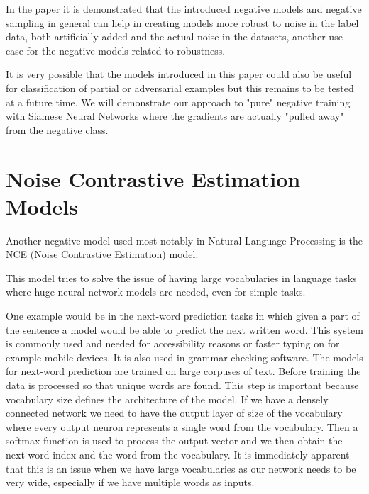 \documentclass[b5paper]{book}
\let\cite\parencite
\begin{document}
In the paper it is demonstrated that the introduced negative models and negative sampling in general can help in creating models more robust to noise in the label data, both artificially added and the actual noise in the datasets, another use case for the negative models related to robustness.

It is very possible that the models introduced in this paper could also be useful for classification of partial or adversarial examples but this remains to be tested at a future time. We will demonstrate our approach to "pure" negative training with Siamese Neural Networks where the gradients are actually "pulled away" from the negative class.

\section{Noise Contrastive Estimation Models}

Another negative model used most notably in Natural Language Processing is the NCE (Noise Contrastive Estimation) \cite{mnih2013learning} model.

This model tries to solve the issue of having large vocabularies in language tasks where huge neural network models are needed, even for simple tasks. 

One example would be in the next-word prediction tasks in which given a part of the sentence a model would be able to predict the next written word. This system is commonly used and needed for accessibility reasons or faster typing on for example mobile devices. It is also used in grammar checking software. The models for next-word prediction are trained on large corpuses of text. Before training the data is processed so that unique words are found. This step is important because vocabulary size defines the architecture of the model. If we have a densely connected network we need to have the output layer of size of the vocabulary where every output neuron represents a single word from the vocabulary. Then a softmax function is used to process the output vector and we then obtain the next word index and the word from the vocabulary. It is immediately apparent that this is an issue when we have large vocabularies as our network needs to be very wide, especially if we have multiple words as inputs. 
\end{document}
